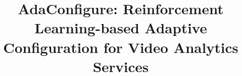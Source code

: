 \documentclass{article}
\begin{document}
\sloppy

\def\x{{\mathbf x}}
\def\L{{\cal L}}

\title{AdaConfigure: Reinforcement Learning-based Adaptive Configuration for Video Analytics Services}

%
\address{}

\maketitle





%






\end{document}
